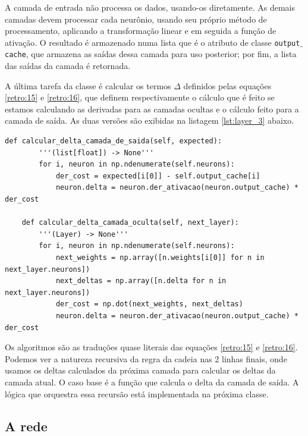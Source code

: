 A camada de entrada não processa os dados, usando-os diretamente. As demais camadas devem processar cada neurônio, usando seu próprio método de processamento, aplicando a transformação linear e em seguida a função de ativação. O resultado é armazenado numa lista  que é o atributo de classe \texttt{output$\_$cache}, que armazena as saídas dessa camada para uso posterior; por fim, a lista das saídas da camada é retornada.

A última tarefa da classe  é calcular os termos $\Delta$ definidos pelas equações \ref{retro:15} e \ref{retro:16}, que definem respectivamente o cálculo que é feito se estamos calculando as derivadas para as camadas ocultas e o cálculo feito para a camada de saída. As duas versões são exibidas na listagem \ref{lst:layer_3} abaixo.

\begin{scriptsize}
\estiloR
\begin{lstlisting}[caption={Trecho da classe \eng{Layer}}, label={lst:layer_3}, escapeinside={\%}]
def calcular_delta_camada_de_saida(self, expected):
        '''(list[float]) -> None'''
        for i, neuron in np.ndenumerate(self.neurons):
            der_cost = expected[i[0]] - self.output_cache[i]
            neuron.delta = neuron.der_ativacao(neuron.output_cache) * der_cost

    def calcular_delta_camada_oculta(self, next_layer):
        '''(Layer) -> None'''
        for i, neuron in np.ndenumerate(self.neurons):
            next_weights = np.array([n.weights[i[0]] for n in next_layer.neurons])
            next_deltas = np.array([n.delta for n in next_layer.neurons])
            der_cost = np.dot(next_weights, next_deltas)
            neuron.delta = neuron.der_ativacao(neuron.output_cache) * der_cost
\end{lstlisting}
\end{scriptsize}

Os algoritmos são as traduções quase literais das equações \ref{retro:15} e \ref{retro:16}. Podemos ver a natureza recursiva da regra da cadeia nas 2 linhas finais, onde usamos os deltas calculados da próxima camada para calcular os deltas da camada atual. O caso base é a função que calcula o delta da camada de saída. A lógica que orquestra essa recursão está implementada na próxima classe.

\subsection{A rede}

